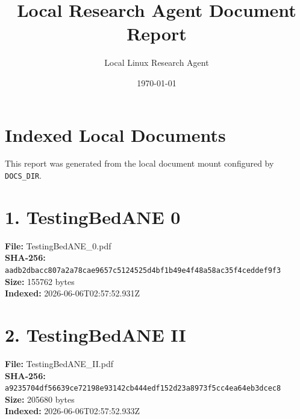 \documentclass[11pt,a4paper]{article}
\title{Local Research Agent Document Report}
\author{Local Linux Research Agent}
\date{\today}
\begin{document}
\maketitle

\section*{Indexed Local Documents}
This report was generated from the local document mount configured by \texttt{DOCS\_DIR}.

\section*{1. TestingBedANE 0}
\textbf{File:} TestingBedANE\_0.pdf\\
\textbf{SHA-256:} \texttt{aadb2dbacc807a2a78cae9657c5124525d4bf1b49e4f48a58ac35f4ceddef9f3}\\
\textbf{Size:} 155762 bytes\\
\textbf{Indexed:} 2026-06-06T02:57:52.931Z

\section*{2. TestingBedANE II}
\textbf{File:} TestingBedANE\_II.pdf\\
\textbf{SHA-256:} \texttt{a9235704df56639ce72198e93142cb444edf152d23a8973f5cc4ea64eb3dcec8}\\
\textbf{Size:} 205680 bytes\\
\textbf{Indexed:} 2026-06-06T02:57:52.933Z
\end{document}
